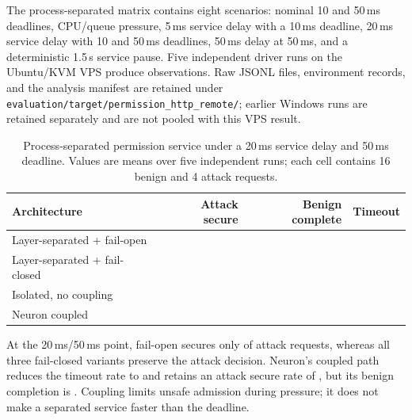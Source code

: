 The process-separated matrix contains eight scenarios: nominal 10 and
50\,ms deadlines, CPU/queue pressure, 5\,ms service delay with a 10\,ms
deadline, 20\,ms service delay with 10 and 50\,ms deadlines, 50\,ms delay at
50\,ms, and a deterministic 1.5\,s service pause. Five independent driver
runs on the Ubuntu/KVM VPS produce \PermissionHttpObservationCount{}
observations. Raw JSONL files, environment records, and the analysis manifest
are retained under
\texttt{evaluation/target/permission\_http\_remote/}; earlier Windows runs
are retained separately and are not pooled with this VPS result.

\begin{table}[t]
\centering
\small
\caption{Process-separated permission service under a 20\,ms service delay and 50\,ms deadline. Values are means over five independent runs; each cell contains 16 benign and 4 attack requests.}
\label{tab:http-delay}
\begin{tabular}{lrrr}
\toprule
Architecture & Attack secure & Benign complete & Timeout \\
\midrule
Layer-separated + fail-open & \PermissionHttpdelayTwentymsFiftymsLAYERSEPARATEDFAILOPENAttackSecure{} & \PermissionHttpdelayTwentymsFiftymsLAYERSEPARATEDFAILOPENBenignComplete{} & \PermissionHttpdelayTwentymsFiftymsLAYERSEPARATEDFAILOPENTimeout{} \\
Layer-separated + fail-closed & \PermissionHttpdelayTwentymsFiftymsLAYERSEPARATEDFAILCLOSEDAttackSecure{} & \PermissionHttpdelayTwentymsFiftymsLAYERSEPARATEDFAILCLOSEDBenignComplete{} & \PermissionHttpdelayTwentymsFiftymsLAYERSEPARATEDFAILCLOSEDTimeout{} \\
Isolated, no coupling & \PermissionHttpdelayTwentymsFiftymsISOLATEDNOCOUPLINGAttackSecure{} & \PermissionHttpdelayTwentymsFiftymsISOLATEDNOCOUPLINGBenignComplete{} & \PermissionHttpdelayTwentymsFiftymsISOLATEDNOCOUPLINGTimeout{} \\
Neuron coupled & \PermissionHttpdelayTwentymsFiftymsNEURONCOUPLEDAttackSecure{} & \PermissionHttpdelayTwentymsFiftymsNEURONCOUPLEDBenignComplete{} & \PermissionHttpdelayTwentymsFiftymsNEURONCOUPLEDTimeout{} \\
\bottomrule
\end{tabular}
\end{table}

At the 20\,ms/50\,ms point, fail-open secures only
\PermissionHttpdelayTwentymsFiftymsLAYERSEPARATEDFAILOPENAttackSecure{} of attack
requests, whereas all three fail-closed variants preserve the attack
decision. Neuron's coupled path reduces the timeout rate to
\PermissionHttpdelayTwentymsFiftymsNEURONCOUPLEDTimeout{} and retains an attack secure
rate of \PermissionHttpdelayTwentymsFiftymsNEURONCOUPLEDAttackSecure{}, but its benign
completion is \PermissionHttpdelayTwentymsFiftymsNEURONCOUPLEDBenignComplete{}.
Coupling limits unsafe admission during pressure; it does not make a
separated service faster than the deadline.

